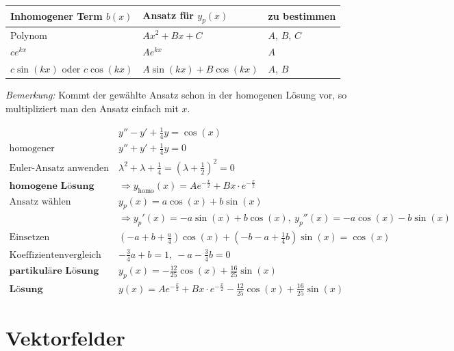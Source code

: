 \documentclass[11pt]{article}
\begin{document}
\begin{table}[H]
\centering
\begin{tabular}{|l|l|l|}
\hline
\textbf{Inhomogener Term $b(x)$} & \textbf{Ansatz f{\"u}r $y_p(x)$}	& \textbf{zu bestimmen}		\\ \hline
Polynom				& $Ax^2 + Bx + C$			& $A$, $B$, $C$		\\ \hline
$c e^{k x}$ & $Ae^{kx}$					& $A$				\\ \hline
$c\sin(kx)$ oder $c\cos(kx)$ & $A\sin(kx) + B\cos(kx)$ & $A$, $B$ \\ \hline

\end{tabular}
\end{table}

\emph{Bemerkung:} Kommt der gewählte Ansatz schon in der homogenen Lösung vor, so multipliziert man den Ansatz einfach mit $x$.

\begin{equation*}
\begin{split}
	& y'' - y' + \frac{1}{4}y = \cos(x) \\
	\text{homogener}\quad & y'' + y' + \frac{1}{4}y = 0 \\
	\text{Euler-Ansatz anwenden}\quad & \lambda^2 + \lambda + \frac{1}{4} = (\lambda + \frac{1}{2})^2 = 0 \\
	\textbf{homogene L{\"o}sung}\quad &\Rightarrow y_\text{homo}(x) = Ae^{-\frac{x}{2}} + Bx \cdot e^{-\frac{x}{2}} \\
	\text{Ansatz w{\"a}hlen}\quad & y_p(x) = a\cos(x) + b\sin(x) \\
							  & \Rightarrow y_p'(x) = -a\sin(x) + b\cos(x),\  y_p''(x) = -a\cos(x) -b \sin(x) \\
	\text{Einsetzen}\quad & (-a + b + \frac{a}{4})\cos(x) + (-b -a + \frac{1}{4}b)\sin(x) = \cos(x) \\
	\text{Koeffizientenvergleich}\quad & -\frac{3}{4}a + b = 1,\ -a-\frac{3}{4}b = 0 \\
	\textbf{partikul{\"a}re L{\"o}sung}\quad & y_p(x) = -\frac{12}{25}\cos(x) + \frac{16}{25}\sin(x) \\
	\textbf{L{\"o}sung}\quad & y(x) = Ae^{-\frac{x}{2}} + Bx \cdot e^{-\frac{x}{2}} -\frac{12}{25}\cos(x) + \frac{16}{25}\sin(x)
\end{split}
\end{equation*}

\section{Vektorfelder}
\end{document}
